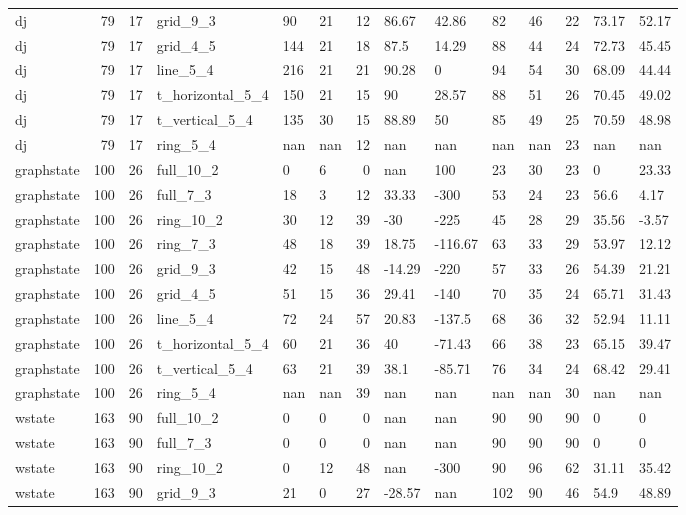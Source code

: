 \begin{longtable}{lrrlllrllllrll}
dj & 79 & 17 & grid\_9\_3 & 90 & 21 & 12 & 86.67 & 42.86 & 82 & 46 & 22 & 73.17 & 52.17 \\
dj & 79 & 17 & grid\_4\_5 & 144 & 21 & 18 & 87.5 & 14.29 & 88 & 44 & 24 & 72.73 & 45.45 \\
dj & 79 & 17 & line\_5\_4 & 216 & 21 & 21 & 90.28 & 0 & 94 & 54 & 30 & 68.09 & 44.44 \\
dj & 79 & 17 & t\_horizontal\_5\_4 & 150 & 21 & 15 & 90 & 28.57 & 88 & 51 & 26 & 70.45 & 49.02 \\
dj & 79 & 17 & t\_vertical\_5\_4 & 135 & 30 & 15 & 88.89 & 50 & 85 & 49 & 25 & 70.59 & 48.98 \\
dj & 79 & 17 & ring\_5\_4 & nan & nan & 12 & nan & nan & nan & nan & 23 & nan & nan \\
graphstate & 100 & 26 & full\_10\_2 & 0 & 6 & 0 & nan & 100 & 23 & 30 & 23 & 0 & 23.33 \\
graphstate & 100 & 26 & full\_7\_3 & 18 & 3 & 12 & 33.33 & -300 & 53 & 24 & 23 & 56.6 & 4.17 \\
graphstate & 100 & 26 & ring\_10\_2 & 30 & 12 & 39 & -30 & -225 & 45 & 28 & 29 & 35.56 & -3.57 \\
graphstate & 100 & 26 & ring\_7\_3 & 48 & 18 & 39 & 18.75 & -116.67 & 63 & 33 & 29 & 53.97 & 12.12 \\
graphstate & 100 & 26 & grid\_9\_3 & 42 & 15 & 48 & -14.29 & -220 & 57 & 33 & 26 & 54.39 & 21.21 \\
graphstate & 100 & 26 & grid\_4\_5 & 51 & 15 & 36 & 29.41 & -140 & 70 & 35 & 24 & 65.71 & 31.43 \\
graphstate & 100 & 26 & line\_5\_4 & 72 & 24 & 57 & 20.83 & -137.5 & 68 & 36 & 32 & 52.94 & 11.11 \\
graphstate & 100 & 26 & t\_horizontal\_5\_4 & 60 & 21 & 36 & 40 & -71.43 & 66 & 38 & 23 & 65.15 & 39.47 \\
graphstate & 100 & 26 & t\_vertical\_5\_4 & 63 & 21 & 39 & 38.1 & -85.71 & 76 & 34 & 24 & 68.42 & 29.41 \\
graphstate & 100 & 26 & ring\_5\_4 & nan & nan & 39 & nan & nan & nan & nan & 30 & nan & nan \\
wstate & 163 & 90 & full\_10\_2 & 0 & 0 & 0 & nan & nan & 90 & 90 & 90 & 0 & 0 \\
wstate & 163 & 90 & full\_7\_3 & 0 & 0 & 0 & nan & nan & 90 & 90 & 90 & 0 & 0 \\
wstate & 163 & 90 & ring\_10\_2 & 0 & 12 & 48 & nan & -300 & 90 & 96 & 62 & 31.11 & 35.42 \\
wstate & 163 & 90 & grid\_9\_3 & 21 & 0 & 27 & -28.57 & nan & 102 & 90 & 46 & 54.9 & 48.89 \\

\end{longtable}
